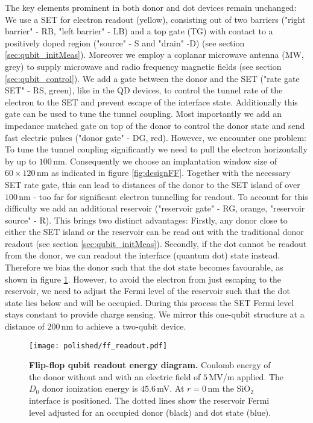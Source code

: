 The key elements prominent in both donor and dot devices remain unchanged: We use a SET for electron readout (yellow), consisting out of two barriers ("right barrier" - RB, "left barrier" - LB) and a top gate (TG) with contact to a positively doped region ("source" - S and "drain" -D) (see section \ref{sec:qubit_initMeas}). Moreover we employ a coplanar microwave antenna (MW, grey) to supply microwave and radio frequency magnetic fields (see section \ref{sec:qubit_control}). 
We add a gate between the donor and the SET ("rate gate SET" - RS, green), like in the QD devices, to control the tunnel rate of the electron to the SET and prevent escape of the interface state. Additionally this gate can be used to tune the tunnel coupling. Most importantly we add an impedance matched gate on top of the donor to control the donor state and send fast electric pulses ("donor gate" - DG, red). 
However, we encounter one problem: To tune the tunnel coupling significantly we need to pull the electron horizontally by up to $100\,$nm. Consequently we choose an implantation window size of $60\times120\,$nm as indicated in figure \ref{fig:designFF}. Together with the necessary SET rate gate, this can lead to distances of the donor to the SET island of over $100\,$nm - too far for significant electron tunnelling for readout. To account for this difficulty we add an additional reservoir ("reservoir gate" - RG, orange, "reservoir source" - R). This brings two distinct advantages: Firstly, any donor close to either the SET island or the reservoir can be read out with the traditional donor readout (see section \ref{sec:qubit_initMeas}). Secondly, if the dot cannot be readout from the donor, we can readout the interface (quantum dot) state instead. Therefore we bias the donor such that the dot state becomes favourable, as shown in figure \ref{fig:ff_readout}. However, to avoid the electron from just escaping to the reservoir, we need to adjust the Fermi level of the reservoir such that the dot state lies below and will be occupied. During this process the SET Fermi level stays constant to provide charge sensing. 
We mirror this one-qubit structure at a distance of $200\,$nm to achieve a two-qubit device.

\begin{figure}
	\centering
	\texttt{[image: polished/ff\_readout.pdf]}
	\caption[Flip-flop qubit readout energy diagram]{\textbf{Flip-flop qubit readout energy diagram. } Coulomb energy of the donor without and with an electric field of $5\,$MV/m applied. The $D_0$ donor ionization energy is $45.6\,$mV. At $r=0\,$nm the SiO$_2$ interface is positioned. The dotted lines show the reservoir Fermi level adjusted for an occupied donor (black) and dot state (blue). }
	\label{fig:ff_readout}
\end{figure}

